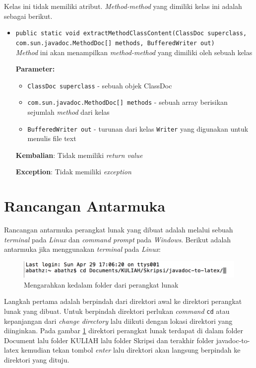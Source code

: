 \documentclass[a4paper,twoside]{article}
\begin{document}
\begin{enumerate}
\begin{enumerate}
Kelas ini tidak memiliki atribut. \textit{Method-method} yang dimiliki kelas ini adalah sebagai berikut.
\begin{itemize}
\item \texttt{public static void extractMethodClassContent(ClassDoc superclass, \\com.sun.javadoc.MethodDoc[] methods, BufferedWriter out)}\\ 
\textit{Method} ini akan menampilkan \textit{method-method} yang dimiliki
 oleh sebuah kelas

\textbf{Parameter:}
\begin{itemize}
\item \texttt{ClassDoc superclass} - 
sebuah objek ClassDoc
\item \texttt{com.sun.javadoc.MethodDoc[] methods} - 
sebuah array berisikan sejumlah \textit{method} dari kelas
\item \texttt{BufferedWriter out} - 
turunan dari kelas \texttt{Writer} yang digunakan untuk menulis
 file text
\end{itemize}
\textbf{Kembalian}: Tidak memiliki \textit{return value}

\textbf{Exception}: Tidak memiliki \textit{exception}

\end{itemize}
\end{enumerate}

\section{Rancangan Antarmuka}
\label{sec:antarmuka}
Rancangan antarmuka perangkat lunak yang dibuat adalah melalui sebuah {\it terminal} pada {\it Linux} dan {\it command prompt} pada {\it Windows}. Berikut adalah antarmuka jika menggunakan {\it terminal} pada {\it Linux}: 

\begin{figure}[H]
	\centering  
	\includegraphics[scale=0.5]{Gambar/1}  
	\caption[]{Mengarahkan kedalam folder dari perangkat lunak} 
	\label{fig:1} 
\end{figure}
Langkah pertama adalah berpindah dari direktori awal ke direktori perangkat lunak yang dibuat. Untuk berpindah direktori perlukan {\it command} \texttt{cd} atau kepanjangan dari {\it change directory} lalu diikuti dengan lokasi direktori yang diinginkan. Pada gambar \ref{fig:1} direktori perangkat lunak terdapat di dalam folder Document lalu folder KULIAH lalu folder Skripsi dan terakhir folder javadoc-to-latex kemudian tekan tombol {\it enter} lalu direktori akan langsung berpindah ke direktori yang dituju.


\end{enumerate}
\end{document}
